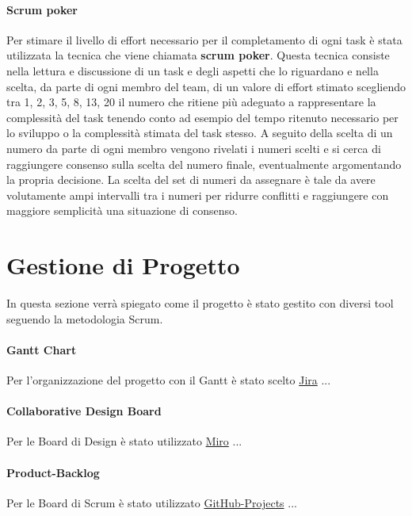     \paragraph{Scrum poker} Per stimare il livello di effort necessario per il completamento di ogni task è stata utilizzata la tecnica che viene chiamata \textbf{scrum poker}. Questa tecnica consiste nella lettura e discussione di un task e degli aspetti che lo riguardano e nella scelta, da parte di ogni membro del team, di un valore di effort stimato scegliendo tra 1, 2, 3, 5, 8, 13, 20 il numero che ritiene più adeguato a rappresentare la complessità del task tenendo conto ad esempio del tempo ritenuto necessario per lo sviluppo o la complessità stimata del task stesso. A seguito della scelta di un numero da parte di ogni membro vengono rivelati i numeri scelti e si cerca di raggiungere consenso sulla scelta del numero finale, eventualmente argomentando la propria decisione. La scelta del set di numeri da assegnare è tale da avere volutamente ampi intervalli tra i numeri per ridurre conflitti e raggiungere con maggiore semplicità una situazione di consenso.

\section{Gestione di Progetto}
In questa sezione verrà spiegato come il progetto è stato gestito con diversi tool seguendo la metodologia Scrum.
    \paragraph{Gantt Chart} 
    Per l'organizzazione del progetto con il Gantt è stato scelto \href{https://riccardo-omiccioli.atlassian.net/jira/software/projects/IQ/boards/1/roadmap}{Jira} ...
    
    \paragraph{Collaborative Design Board}
    Per le Board di Design è stato utilizzato \href{https://miro.com/app/board/uXjVPN93uLs=/?share_link_id=56431555728}{Miro} ...

    \paragraph{Product-Backlog}
    Per le Board di Scrum è stato utilizzato \href{https://github.com/orgs/ISIQuiz/projects/3}{GitHub-Projects} ...
    
